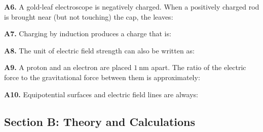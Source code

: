 \begin{exercisebox}[21]
\textbf{A6.} A gold-leaf electroscope is negatively
charged. When a positively charged rod is brought
near (but not touching) the cap, the leaves:


\vspace{0.4cm}

\textbf{A7.} Charging by induction produces a
charge that is:


\vspace{0.4cm}

\textbf{A8.} The unit of electric field strength
can also be written as:


\vspace{0.4cm}

\textbf{A9.} A proton and an electron are placed
$1\ \text{nm}$ apart. The ratio of the electric
force to the gravitational force between them is
approximately:


\vspace{0.4cm}

\textbf{A10.} Equipotential surfaces and electric
field lines are always:


\vspace{0.6cm}

\subsection*{Section B: Theory and Calculations}


\end{exercisebox}

